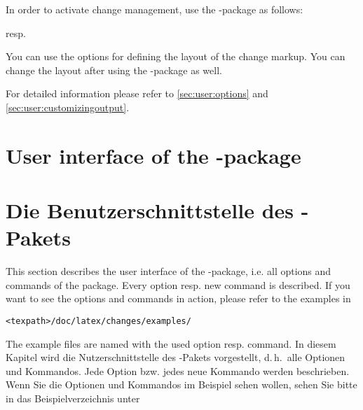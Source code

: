 
In order to activate change management, use the -package as follows:


resp.


You can use the options for defining the layout of the change markup.
You can change the layout after using the -package as well.

For detailed information please refer to \autoref{sec:user:options} and \autoref{sec:user:customizingoutput}.














\ifENGLISH
\section{User interface of the -package}
\fi
\ifGERMAN
	\section{Die Benutzerschnittstelle des -Pakets}
\fi
\label{sec:user}

\ifENGLISH
This section describes the user interface of the -package, i.e. all options and commands of the package.
Every option resp. new command is described.
If you want to see the options and commands in action, please refer to the examples in

\texttt{<texpath>/doc/latex/changes/examples/}

The example files are named with the used option resp. command.
\fi
\ifGERMAN
	In diesem Kapitel wird die Nutzerschnittstelle des -Pakets vorgestellt, d.\,h.\ alle Optionen und Kommandos.
	Jede Option bzw. jedes neue Kommando werden beschrieben.
	Wenn Sie die Optionen und Kommandos im Beispiel sehen wollen, sehen Sie bitte in das Beispielverzeichnis unter

